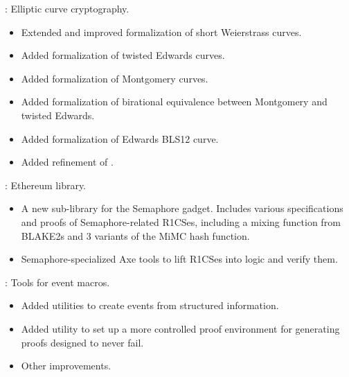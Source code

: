 
\begin{frame}

\implibtitle

:
Elliptic curve cryptography.
\begin{itemize}
\item Extended and improved formalization of short Weierstrass curves.
\item Added formalization of twisted Edwards curves.
\item Added formalization of Montgomery curves.
\item Added formalization of birational equivalence between
      Montgomery and twisted Edwards.
\item Added formalization of Edwards BLS12 curve.
\item Added refinement of .
\end{itemize}

\end{frame}


\begin{frame}

\implibtitle

:
Ethereum library.
\begin{itemize}
\item A new sub-library for the Semaphore gadget.  Includes various
specifications and proofs of Semaphore-related R1CSes, including a
mixing function from BLAKE2s and 3 variants of the MiMC hash function.
\item Semaphore-specialized Axe tools to lift R1CSes into logic and
verify them.
\end{itemize}

\end{frame}


\begin{frame}

\implibtitle

:
Tools for event macros.
\begin{itemize}
\item Added utilities to create events from structured information.
\item Added utility to set up a more controlled proof environment
      for generating proofs designed to never fail.
\item Other improvements.
\end{itemize}

\end{frame}


